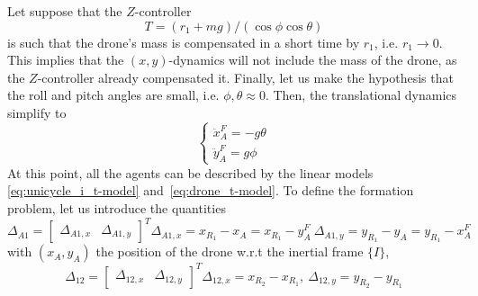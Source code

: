 \documentclass{ifacconf}
\begin{document}
Let suppose that the $Z$-controller 
\begin{equation}
    T = (r_1 + mg) / (\cos \phi \cos \theta)
\end{equation}
is such that the drone's mass is compensated in a short time
by $r_1$, i.e. $r_1 \to 0$.
This implies that the $(x,y)$-dynamics will not include the mass of the drone,
as the $Z$-controller already compensated it.
Finally, let us make the hypothesis that the roll and pitch angles 
are small, i.e. $\phi,\theta \approx 0$.
Then, the translational dynamics simplify to 
\begin{equation}
    \begin{cases}
        \ddot{x}^F_A = -g\theta \\
        \ddot{y}^F_A = g\phi
    \end{cases}
    \label{eq:drone_t-model}
\end{equation}
At this point, all the agents can be described by the linear models
\eqref{eq:unicycle_i_t-model} and~\eqref{eq:drone_t-model}.
To define the formation problem, let us introduce the quantities
\begin{subequations}
    \begin{equation}
        \Delta_{A1} = \begin{bmatrix}
            \Delta_{A1,x} & \Delta_{A1, y}
        \end{bmatrix}^T 
    \end{equation}
    \begin{equation}
        \Delta_{A1,x} = x_{R_1} - x_A = x_{R_1} - y^F_A \  
    \end{equation}
    \begin{equation}
        \Delta_{A1,y} = y_{R_1} - y_A = y_{R_1} - x^F_A
    \end{equation}
\end{subequations}
with $(x_A, y_A)$ the position of the drone w.r.t the inertial frame $\{I\}$,
\begin{subequations}
    \begin{equation}
        \Delta_{12} = \begin{bmatrix}
        \Delta_{12,x} & \Delta_{12, y}
    \end{bmatrix}^T 
    \end{equation}
    \begin{equation}
        \Delta_{12,x} = x_{R_2} -  x_{R_1}, \ 
        \Delta_{12,y} = y_{R_2} -  y_{R_1}
    \end{equation}
\end{subequations}
\end{document}

